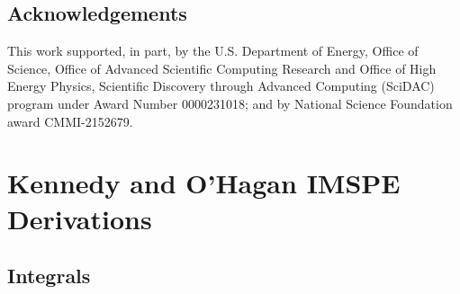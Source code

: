 \documentclass[
]{article}
\begin{document}
\hypertarget{acknowledgements}{%
\subsection*{Acknowledgements}\label{acknowledgements}}

This work supported, in part, by the U.S. Department of Energy, Office of Science, Office of
Advanced Scientific Computing Research and Office of High Energy Physics,
Scientific Discovery through Advanced Computing (SciDAC) program under Award
Number 0000231018; and by National Science Foundation award CMMI-2152679.



\hypertarget{appendix-appendix}{%
\appendix}


\hypertarget{kennedy-and-ohagan-imspe-derivations}{%
\section{Kennedy and O'Hagan IMSPE Derivations}\label{kennedy-and-ohagan-imspe-derivations}}

\hypertarget{intA}{%
\subsection{Integrals}\label{intA}}
\end{document}
